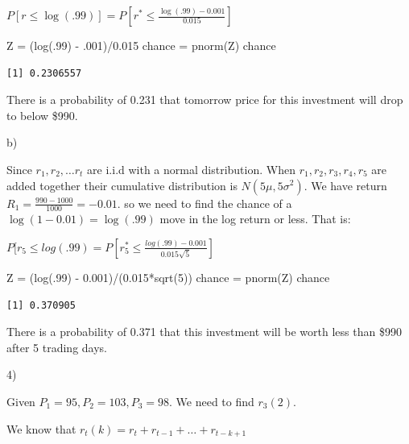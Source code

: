 \documentclass[
  letterpaper,
  DIV=11,
  numbers=noendperiod]{scrartcl}
\newenvironment{Shaded}{\begin{snugshade}}{\end{snugshade}}
\newcommand{\DecValTok}[1]{\textcolor[rgb]{0.68,0.00,0.00}{#1}}
\newcommand{\FloatTok}[1]{\textcolor[rgb]{0.68,0.00,0.00}{#1}}
\newcommand{\FunctionTok}[1]{\textcolor[rgb]{0.28,0.35,0.67}{#1}}
\newcommand{\NormalTok}[1]{\textcolor[rgb]{0.00,0.23,0.31}{#1}}
\newcommand{\OtherTok}[1]{\textcolor[rgb]{0.00,0.23,0.31}{#1}}
\newcommand{\SpecialCharTok}[1]{\textcolor[rgb]{0.37,0.37,0.37}{#1}}
\begin{document}
\(P[r \leq \log(.99)]=P[r^* \leq \frac{\log(.99)-0.001}{0.015}]\)

\begin{Shaded}
\begin{Highlighting}[]
\NormalTok{Z }\OtherTok{=}\NormalTok{ (}\FunctionTok{log}\NormalTok{(.}\DecValTok{99}\NormalTok{) }\SpecialCharTok{{-}}\NormalTok{ .}\DecValTok{001}\NormalTok{)}\SpecialCharTok{/}\FloatTok{0.015}
\NormalTok{chance }\OtherTok{=} \FunctionTok{pnorm}\NormalTok{(Z)}
\NormalTok{chance}
\end{Highlighting}
\end{Shaded}

\begin{verbatim}
[1] 0.2306557
\end{verbatim}

There is a probability of 0.231 that tomorrow price for this investment
will drop to below \$990.

b)

Since \(r_1,r_2,…r_t\) are i.i.d with a normal distribution. When
\(r_1,r_2,r_3,r_4,r_5\) are added together their cumulative distribution
is \(N(5 \mu,5\sigma^2)\). We have return
\(R_1=\frac{990-1000}{1000}=-0.01\). so we need to find the chance of a
\(\log(1-0.01) = \log(.99)\) move in the log return or less. That is:

\(P[r_5 \leq log(.99)=P[r_5^* \leq\frac{log(.99)-0.001}{0.015\sqrt{5}}]\)

\begin{Shaded}
\begin{Highlighting}[]
\NormalTok{Z }\OtherTok{=}\NormalTok{ (}\FunctionTok{log}\NormalTok{(.}\DecValTok{99}\NormalTok{) }\SpecialCharTok{{-}} \FloatTok{0.001}\NormalTok{)}\SpecialCharTok{/}\NormalTok{(}\FloatTok{0.015}\SpecialCharTok{*}\FunctionTok{sqrt}\NormalTok{(}\DecValTok{5}\NormalTok{))}
\NormalTok{chance }\OtherTok{=} \FunctionTok{pnorm}\NormalTok{(Z)}
\NormalTok{chance}
\end{Highlighting}
\end{Shaded}

\begin{verbatim}
[1] 0.370905
\end{verbatim}

There is a probability of 0.371 that this investment will be worth less
than \$990 after 5 trading days.

4)

Given \(P_1=95,P_2=103,P_3=98\). We need to find \(r_3(2)\).

We know that \(r_t(k)=r_t+r_{t-1}+\dots+r_{t-k+1}\)
\end{document}
